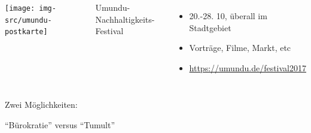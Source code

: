 \documentclass[t]{beamer}
\begin{document}
\begin{frame}[label=ct7]{\color{fg}{Anschlusskommunikation (2)}}


% 

\begin{columns}
 
 \texttt{[image: img-src/umundu-postkarte]}

 


\vspace{8mm}


Umundu-Nachhaltigkeits-Festival
  \begin{itemize}
   \item  20.-28. 10, überall im Stadtgebiet
   \item Vorträge, Filme, Markt, etc
   \item \url{https://umundu.de/festival2017}
  \end{itemize}

\end{columns}
  
  
 
\end{frame}





\begin{frame}[label=ct8]{\color{fg}{Verteilung der Sticks}}
 \vspace{10mm}
Zwei Möglichkeiten:\\[10mm]
\begin{center}
"`Bürokratie"'  \qquad versus \qquad "`Tumult"'
\end{center}
\end{frame}

 
\end{document}
